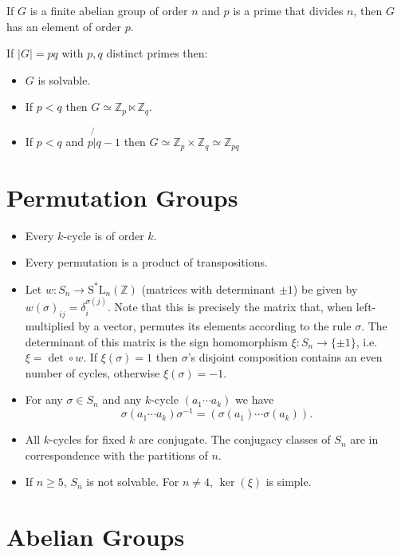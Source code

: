 \documentclass{article}
\begin{document}
If $G$ is a finite abelian group of order $n$ and $p$ is a prime that
divides $n$, then $G$ has an element of order $p$.

If $|G| = pq$ with $p, q$ distinct primes then:
\begin{itemize}
  \item{
    $G$ is solvable.
  }
  \item{
    If $p < q$ then $G \simeq \mathbb{Z}_p \ltimes \mathbb{Z}_q$.
  }
  \item{
    If $p < q$ and $p \not{\vert} q - 1$ then
    $G \simeq \mathbb{Z}_p \times \mathbb{Z}_q
       \simeq \mathbb{Z}_{pq}$
  }
\end{itemize}

\section{Permutation Groups}
\begin{itemize}
  \item{
    Every $k$-cycle is of order $k$.
  }
  \item{
    Every permutation is a product of transpositions.
  }
  \item{
    Let $w : S_n \to \mathrm{S^\ast L}_n(\mathbb{Z})$ (matrices with
    determinant $\pm 1$) be given by $w(\sigma)_{ij} =
    \delta_i^{\sigma(j)}$. Note that this is precisely the matrix that,
    when left-multiplied by a vector, permutes its elements according to
    the rule $\sigma$. The determinant of this matrix is the sign
    homomorphism $\xi : S_n \to \{ \pm 1 \}$, i.e. $\xi = \det \circ
    w$. If $\xi(\sigma) = 1$ then $\sigma$'s disjoint composition
    contains an even number of cycles, otherwise $\xi(\sigma) = -1$.
  }
  \item{
    For any $\sigma \in S_n$ and any $k$-cycle $(a_1 \cdots a_k)$ we
    have
    $$
    \sigma (a_1 \cdots a_k) \sigma^{-1}
  = (\sigma(a_1) \cdots \sigma(a_k)).
    $$
  }
  \item{
    All $k$-cycles for fixed $k$ are conjugate.
    The conjugacy classes of $S_n$ are in correspondence with the
    partitions of $n$.
  }
  \item{
    If $n \geq 5$, $S_n$ is not solvable. For $n \neq 4$,
    $\ker(\xi)$ is simple.
  }
\end{itemize}

\section{Abelian Groups}
\end{document}
